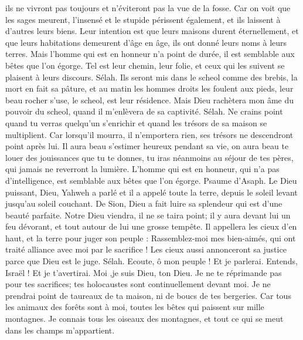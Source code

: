 \begin{multicols}{2}
ils ne vivront pas toujours et n'éviteront pas la vue de la fosse.
Car on voit que les sages meurent, l'insensé et le stupide périssent également, et ils laissent à d'autres leurs biens.
Leur intention est que leurs maisons durent éternellement, et que leurs habitations demeurent d'âge en âge, ils ont donné leurs noms à leurs terres.
Mais l'homme qui est en honneur n'a point de durée, il est semblable aux bêtes que l'on égorge.
Tel est leur chemin, leur folie, et ceux qui les suivent se plaisent à leurs discours. Sélah.
Ils seront mis dans le scheol comme des brebis, la mort en fait sa pâture, et au matin les hommes droits les foulent aux pieds, leur beau rocher s'use, le scheol, est leur résidence.
Mais Dieu rachètera mon âme du pouvoir du scheol, quand il m'enlèvera de sa captivité. Sélah.
Ne crains point quand tu verras quelqu'un s'enrichir et quand les trésors de sa maison se multiplient.
Car lorsqu'il mourra, il n'emportera rien, ses trésors ne descendront point après lui.
Il aura beau s'estimer heureux pendant sa vie, on aura beau te louer des jouissances que tu te donnes,
tu iras néanmoins au séjour de tes pères, qui jamais ne reverront la lumière.
L'homme qui est en honneur, qui n'a pas d'intelligence, est semblable aux bêtes que l'on égorge.
\VerseOne{}Psaume d'Asaph. Le Dieu puissant, Dieu, Yahweh a parlé et il a appelé toute la terre, depuis le soleil levant jusqu'au soleil couchant.
De Sion, Dieu a fait luire sa splendeur qui est d'une beauté parfaite.
Notre Dieu viendra, il ne se taira point; il y aura devant lui un feu dévorant, et tout autour de lui une grosse tempête.
Il appellera les cieux d'en haut, et la terre pour juger son peuple :
Rassemblez-moi mes bien-aimés, qui ont traité alliance avec moi par le sacrifice !
Les cieux aussi annonceront sa justice parce que Dieu est le juge. Sélah.
Ecoute, ô mon peuple ! Et je parlerai. Entends, Israël ! Et je t'avertirai. Moi ,je suis Dieu, ton Dieu.
Je ne te réprimande pas pour tes sacrifices; tes holocaustes sont continuellement devant moi.
Je ne prendrai point de taureaux de ta maison, ni de boucs de tes bergeries.
Car tous les animaux des forêts sont à moi, toutes les bêtes qui paissent sur mille montagnes.
Je connais tous les oiseaux des montagnes, et tout ce qui se meut dans les champs m'appartient.

\end{multicols}

